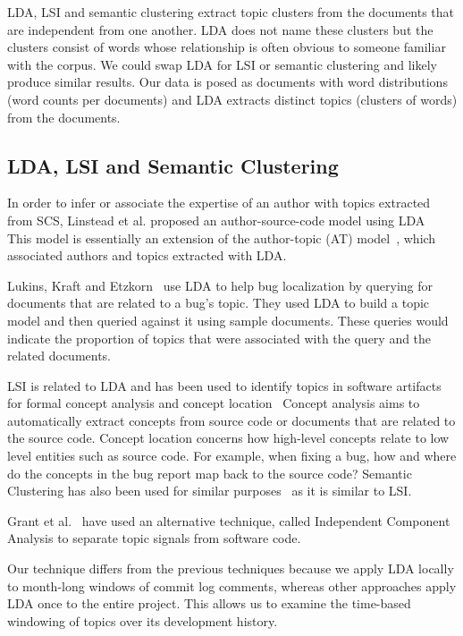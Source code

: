 \documentclass[times, 10pt,twocolumn]{article}
\newcommand{\shrinkit}{\vspace*{-.3em}}
\begin{document}
LDA, LSI and semantic clustering extract topic
clusters from the documents that are independent from one another. LDA
does not name these clusters but the clusters consist of words whose
relationship is often obvious to someone familiar with the corpus. We
could swap LDA for LSI or semantic clustering and likely produce similar
results. Our data is posed as documents with word distributions (word
counts per documents) and LDA extracts distinct topics (clusters of
words) from the documents.

\shrinkit
\subsection{LDA, LSI and Semantic Clustering}
\shrinkit

In order to infer or associate the expertise of an author with topics
extracted from SCS, Linstead et al. proposed an author-source-code model
using LDA~\cite{10.1109/MSR.2007.20}%
This model
is essentially an extension of the author-topic (AT)
model~\cite{1036902}, which associated authors and topics extracted
with LDA.

Lukins, Kraft and Etzkorn~\cite{lukins2008} use LDA to help bug
localization by querying for documents that are related to a bug's topic. They
used LDA to build a topic model and then queried against it using
sample documents. These queries would indicate the proportion of
topics that were associated with the query and the
related documents.

LSI is related to LDA and has been used to identify topics in software
artifacts for formal concept analysis and concept
location~\cite{1374321,10.1109/ICPC.2007.13}
Concept analysis aims to automatically extract concepts from source
code or documents that are related to the source code.  Concept location concerns how
high-level concepts relate to low level entities such as source code. For
example, when fixing a bug, how and where do the concepts in the bug
report map back to the source code?  Semantic Clustering has also been
used for similar purposes~\cite{1698774,1566153} as it is similar to
LSI.

Grant et al.~\cite{scottcordy} have used an alternative technique,
 called Independent Component Analysis to
separate topic signals from software code. 

Our technique differs from the previous techniques because we apply
LDA locally to month-long windows of commit log comments, whereas other
approaches apply LDA once to the entire project. This allows us to
examine the time-based windowing of topics over its development
history.
\end{document}

